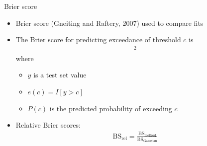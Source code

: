 \documentclass{beamer}
\begin{document}

\begin{frame}{Brier score}
  \begin{itemize} \setlength{\itemsep}{1em}
    \item Brier score (Gneiting and Raftery, 2007) used to compare fits
    \item The Brier score for predicting exceedance of threshold $c$ is
    \begin{align*}
      [e(c) - P(c)]^2
    \end{align*}
    where \vspace{0.25em}
    \begin{itemize} \setlength{\itemsep}{0.25em}
      \item $y$ is a test set value
      \item $e(c) = I[y > c]$
      \item $P(c)$ is the predicted probability of exceeding $c$
    \end{itemize}
    \item Relative Brier scores:
    \begin{align*}
      \text{BS}_\text{rel} = \frac{ \text{BS}_\text{method}}{ \text{BS}_\text{Gaussian}}
    \end{align*}
  \end{itemize}
\end{frame}
\end{document}
